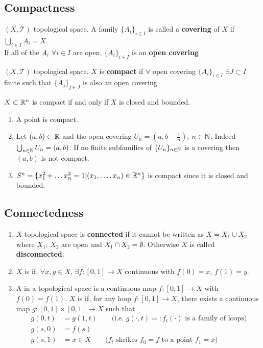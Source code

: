 \documentclass[../main/main.tex]{subfiles}
\newcommand{\topo}{\mathcal T}
\begin{document}
\subsection{Compactness}
\begin{dfn}
$(X,\topo)$ topological space. A family $\{A_i\}_{i\in I}$ is called a \textbf{covering} of $X$ if $\bigcup_{i\in I}A_i=X$.\\
If all of the $A_i$ $\forall i\in I$ are open, $\{A_i\}_{i\in I}$ is an \textbf{open covering}
\end{dfn}

\begin{dfn}
$(X,\topo)$ topological space. $X$ is \textbf{compact} if $\forall$ open covering $\{A_i\}_{i\in I}$ $\exists J\subset I$ finite such that $\{A_j\}_{j\in J}$ is also an open covering
\end{dfn}

\begin{thm}
$X\subset\mathbb R^n$ is compact if and only if $X$ is closed and bounded.
\end{thm}
\begin{ex}
\begin{enumerate}[label=(\alph*)]
\item A point is compact.
\item Let  $(a,b)\subset\mathbb R$ and the open covering $U_n=(a,b-\frac1n)$, $n\in\mathbb N$. Indeed $\bigcup_{n\in\mathbb N}U_n=(a,b)$. If no finite subfamilies of $\{U_n\}_{n\in\mathbb N}$ is a covering then $(a,b)$ is not compact.
\item $S^n=\{x_1^2+\dots x_n^2=1|(x_1,\dots,x_n)\in\mathbb R^n\}$ is compact since it is closed and bounded.
\end{enumerate}
\end{ex}


\subsection{Connectedness}
\begin{dfn}
\begin{enumerate}[label=(\alph*)]
\item $X$ topological space is \textbf{connected} if it cannot be written as $X=X_1\cup X_2$ where $X_1$, $X_2$ are open and $X_1\cap X_2=\emptyset$. Otherwise $X$ is called \textbf{disconnected}.
\item $X$ is  if, $\forall x,y\in X$, $\exists f:[0,1]\to X$ continuous with $f(0)=x$, $f(1)=y$.
\item A  in a topological space is a continuous map $f:[0,1]\to X$ with $f(0)=f(1)$. $X$ is  if, for any loop $f:[0,1]\to X$, there exists a continuous map $g:[0,1]\times[0,1]\to X$ such that
\begin{align*}
g(0,t)&=g(1,t)\qquad\text{(i.e. $g(\cdot,t)=:f_t(\cdot)$ is a family of loops)}\\
g(s,0)&=f(s)\\
g(s,1)&=\bar x\in X\qquad\text{($f_t$ shrikes $f_0=f$ to a point $f_1=\bar x$)}
\end{align*}
\end{enumerate}
\end{dfn}
\end{document}
